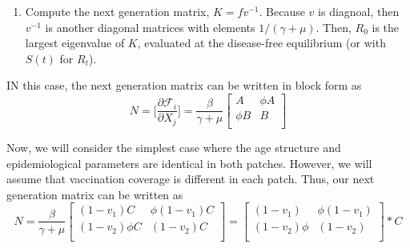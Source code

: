 \documentclass[12pt]{article}
\begin{document}
\begin{enumerate}
\[\begin{bmatrix}
     \theta_{1,1} \frac{S_{1,1}}{N_1} & \cdots & \theta_{1,n} \frac{S_{1,1}}{N_1} & \phi \theta_{1,1} \frac{S_{1,1}}{N_1} & \cdots & \phi \theta_{1,n} \frac{S_{1,1}}{N_1} \\
    \vdots & \ddots & \vdots & \vdots & \ddots & \vdots \\
    \theta_{n,1} \frac{S_{1,n}}{N_1} & \cdots & \theta_{n,n} \frac{S_{1,n}}{N_1} & \phi \theta_{n,1} \frac{S_{1,n}}{N_1} & \cdots & \phi \theta_{n,n} \frac{S_{1,n}}{N_1} \\
     \phi \theta_{1,1} \frac{S_{2,1}}{N_2} & \cdots & \phi \theta_{1,n} \frac{S_{2,1}}{N_2} & \theta_{1,1} \frac{S_{2,1}}{N_2} & \cdots & \theta_{1,n} \frac{S_{2,1}}{N_2} \\
    \vdots & \ddots & \vdots & \vdots & \ddots & \vdots \\
    \phi \theta_{n,1} \frac{S_2,n}{N_2} & \cdots & \phi \theta_{n,n} \frac{S_2,n}{N_2} & \theta_{n,1} \frac{S_2,n}{N_2} & \cdots & \theta_{n,n} \frac{S_2,n}{N_2} \\
    \end{bmatrix}
    \]
    \item Compute the next generation matrix, $K = f v^{-1}$. Because $v$ is diagnoal, then $v^{-1}$ is another diagonal matrices with elements $1/(\gamma + \mu)$. Then, $R_0$ is the largest eigenvalue of $K$, evaluated at the disease-free equilibrium (or with $S(t)$ for $R_t$).
\end{enumerate}

IN this case, the next generation matrix can be written in block form as 
\[
    N = \Big[\frac{\partial \mathcal{F}_i}{\partial X_j}\Big] = \frac{\beta}{\gamma + \mu} 
    \begin{bmatrix}
     A & \phi A \\
        \phi B & B \\
    \end{bmatrix}
    \]

\noindent
Now, we will consider the simplest case where the age structure and epidemiological parameters are identical in both patches. However, we will assume that vaccination coverage is different in each patch. Thus, our next generation matrix can be written as
\[
    N = \frac{\beta}{\gamma + \mu} 
    \begin{bmatrix}
     (1-v_1) C & \phi (1-v_1) C \\
     (1-v_2)\phi C & (1-v_2) C \\
    \end{bmatrix}
     = 
     \begin{bmatrix}
     (1-v_1) & \phi (1-v_1) \\
     (1-v_2)\phi & (1-v_2)  \\
    \end{bmatrix} * C
    \]
\end{document}
